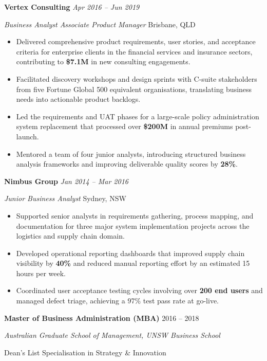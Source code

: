\documentclass[11pt,a4paper]{article}
\newcommand{\ressection}[1]{%
  \vspace{1.6\baselineskip}%
  \noindent{\color{ausnavy}\Large\bfseries\MakeUppercase{#1}}%
  \vspace{0.1\baselineskip}\par
  \noindent{\color{austeal}\rule{\textwidth}{1.2pt}}%
  \vspace{0.7\baselineskip}\par
}
\newcommand{\roleheader}[4]{%
  \noindent\textbf{\large #1} \hfill \textcolor{ausnavy}{\small\textit{#2}}\par
  \noindent\textit{#3} \hfill \textcolor{ausdark}{\small #4}\par
  \vspace{0.25cm}%
}
\begin{document}
\vspace{0.6cm}

\roleheader{Vertex Consulting}{Apr 2016 -- Jun 2019}{Business Analyst \textbar{} Associate Product Manager}{Brisbane, QLD}

\begin{itemize}
  \item Delivered comprehensive product requirements, user stories, and acceptance criteria for enterprise clients in the financial services and insurance sectors, contributing to \textbf{\$7.1M} in new consulting engagements.
  \item Facilitated discovery workshops and design sprints with C-suite stakeholders from five Fortune Global 500 equivalent organisations, translating business needs into actionable product backlogs.
  \item Led the requirements and UAT phases for a large-scale policy administration system replacement that processed over \textbf{\$200M} in annual premiums post-launch.
  \item Mentored a team of four junior analysts, introducing structured business analysis frameworks and improving deliverable quality scores by \textbf{28\%}.
\end{itemize}

\vspace{0.6cm}

\roleheader{Nimbus Group}{Jan 2014 -- Mar 2016}{Junior Business Analyst}{Sydney, NSW}

\begin{itemize}
  \item Supported senior analysts in requirements gathering, process mapping, and documentation for three major system implementation projects across the logistics and supply chain domain.
  \item Developed operational reporting dashboards that improved supply chain visibility by \textbf{40\%} and reduced manual reporting effort by an estimated 15 hours per week.
  \item Coordinated user acceptance testing cycles involving over \textbf{200 end users} and managed defect triage, achieving a 97\% test pass rate at go-live.
\end{itemize}

\ressection{Education}

\noindent\textbf{Master of Business Administration (MBA)} \hfill \textcolor{ausnavy}{2016 -- 2018}\par
\noindent\textit{Australian Graduate School of Management, UNSW Business School}\par
\noindent\small Dean's List \textbar{} Specialisation in Strategy \& Innovation\par
\end{document}
